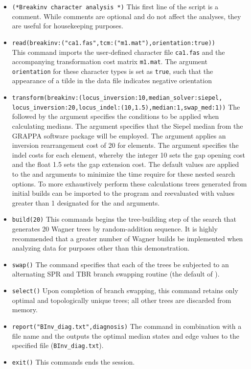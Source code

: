 \begin{itemize}
\item \texttt{(*Breakinv character analysis *)} This first line of the script is a comment. While comments 
are optional and do not affect the analyses, they are useful for housekeeping purposes.
\item \texttt{read(breakinv:("ca1.fas",tcm:("m1.mat"),orientation:true))} \\ This command imports the user-defined 
 character file \texttt{ca1.fas} and the accompanying transformation cost matrix \texttt{m1.mat}.
The argument \texttt{orientation} for these character types is set as \texttt{true}, such that the appearance of a tilde in the data file
indicates negative orientation
\item \texttt{transform(breakinv:(locus\_inversion:10,median\_solver:siepel,\\locus\_inversion:20,locus\_indel:(10,1.5),median:1,swap\_med:1))}  
The  followed by the argument  
specifies the conditions to be applied when calculating medians. The argument  specifies that the Siepel median from the GRAPPA software package \cite{baderetal2002} will be 
employed.  The argument  applies an inversion rearrangement cost of 20 for 
 elements. The argument  specifies the indel costs for 
each  element, whereby the integer 10 sets the gap opening cost and the float 1.5 sets the 
gap extension cost.  The default values are applied to the  and  
arguments to minimize the time require for these nested search options.   To more exhaustively perform these 
calculations trees generated from initial builds can be imported to the program and reevaluated with values greater 
than 1 designated for the  and  arguments.
\item \texttt{build(20)} This commands begins the tree-building step of the search that generates 20 Wagner trees by
 random-addition sequence.  It is highly recommended that a greater number of Wagner builds be implemented when 
 analyzing data for purposes other than this demonstration.
\item \texttt{swap()} The  command specifies that each of the trees be subjected to an alternating 
SPR and TBR branch swapping routine (the default of \poy).
\item \texttt{select()} Upon completion of branch swapping, this command retains only optimal and topologically 
unique trees; all other trees are discarded from memory. 
\item \texttt{report("BInv\_diag.txt",diagnosis)}  The  command in combination with a file name and 
the  outputs the optimal median states and edge values to the specified file (\texttt{BInv\_diag.txt}). 
\item \texttt{exit()} This commands ends the \poy session.
\end{itemize}

